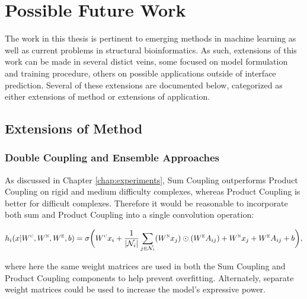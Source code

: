 \chapter{Possible Future Work}
\label{chap:future}

The work in this thesis is pertinent to emerging methods in machine learning as well as current problems in structural bioinformatics.
As such, extensions of this work can be made in several distict veins, some focused on model formulation and training procedure, others on possible applications outside of interface prediction.
Several of these extensions are documented below, categorized as either extensions of method or extensions of application.

\section{Extensions of Method}

\subsection{Double Coupling and Ensemble Approaches}

As discussed in Chapter \ref{chap:experiments}, Sum Coupling outperforms Product Coupling on rigid and medium difficulty complexes, whereas Product Coupling is better for difficult complexes.
Therefore it would be reasonable to incorporate both sum and Product Coupling into a single convolution operation:

\begin{equation}
h_i(x | W^\textsc{c}, W^\textsc{n}, W^\textsc{e}, b) = \sigma \bigg( W^{\textsc{c}} x_i + \frac{1}{|\mathcal{N}_i|}\sum_{j \in \mathcal{N}_i} (W^{\textsc{n}} x_j) \odot (W^{\textsc{e}} A_{ij}) + W^{\textsc{n}} x_j + W^{\textsc{e}} A_{ij} + b \bigg),
\label{eq:double_coupling}
\end{equation}

\noindent
where here the same weight matrices are used in both the Sum Coupling and Product Coupling components to help prevent overfitting. 
Alternately, separate weight matrices could be used to increase the model's expressive power.

